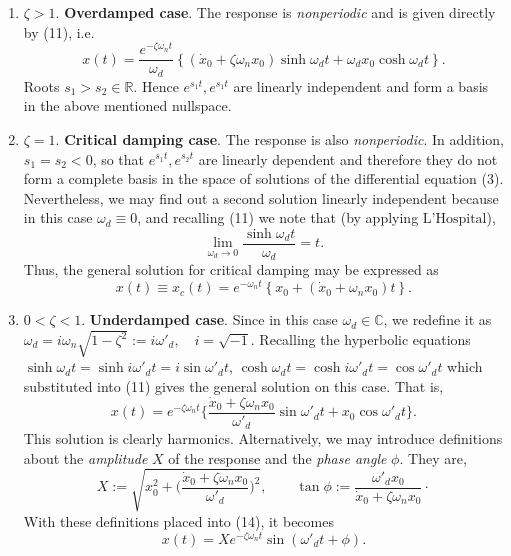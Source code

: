 \documentclass[12pt]{article}
\begin{document}
\begin{enumerate}
\item $\zeta>1$. \textbf{Overdamped case}. The response is \emph{nonperiodic} and is given directly by (11), i.e.
\begin{equation}
x(t)=\frac{e^{-\zeta\omega_n t}}{\omega_d}\left\{(\dot{x}_0+\zeta\omega_n x_0)\sinh{\omega_d t}+
\omega_d x_0\cosh{\omega_d t}\right\}.
\end{equation}
Roots $s_1>s_2\in\mathbb{R}$. Hence $e^{s_1 t},e^{s_1 t}$ are linearly independent and form a basis in the above mentioned nullspace.
\item $\zeta=1$. \textbf{Critical damping case}. The response is also \emph{nonperiodic}. In addition, $s_1=s_2<0$, so that $e^{s_1 t}, e^{s_2 t}$ are linearly dependent and therefore they do not form a complete basis in the space of solutions of the differential equation (3). Nevertheless, we may find out a second solution linearly independent because in this case $\omega_d\equiv 0$, and recalling (11) we note that (by applying $\textrm{L'Hospital}$),
\begin{equation*}
\lim_{\omega_d\to 0}\frac{\sinh{\omega_d t}}{\omega_d}=t. 
\end{equation*}
Thus, the general solution for critical damping may be expressed as
\begin{equation}
x(t)\equiv x_c(t)=e^{-\omega_n t}\left\{x_0+(\dot{x}_0+\omega_n x_0)t\right\}.
\end{equation}
\item $0<\zeta<1$. \textbf{Underdamped case}. Since in this case $\omega_d\in\mathbb{C}$, we redefine it as 
$\omega_d=i\omega_n\sqrt{1-\zeta^2}:=i\omega'_d,\quad i=\sqrt{-1}$.
Recalling the hyperbolic equations $\sinh\omega_d t=\sinh i\omega'_d t=i\sin\omega'_d t$, $\cosh\omega_d t=\cosh i\omega'_d t=\cos\omega'_d t$ which substituted into (11) gives the general solution on this case. That is,
\begin{equation}
x(t)=e^{-\zeta\omega_n t}\bigg\{\frac{\dot{x}_0+\zeta\omega_n x_0}{\omega'_d}\sin{\omega'_d t}+
x_0\cos{\omega'_d t}\bigg\}.
\end{equation}
This solution is clearly harmonics. Alternatively, we may introduce definitions about the \emph{amplitude} $X$ of the response and the \emph{phase angle} $\phi$. They are,
\begin{equation}
X:=\sqrt{x_0^2+\bigg(\frac{\dot{x}_0+\zeta\omega_n x_0}{\omega'_d}\bigg)^2},\qquad
\tan\phi:=\frac{\omega'_d x_0}{\dot{x}_0+\zeta\omega_n x_0}\cdot
\end{equation}
With these definitions placed into (14), it becomes
\begin{equation}
x(t)=Xe^{-\zeta\omega_n t}\sin{(\omega'_d t+\phi)}.
\end{equation}
\end{enumerate}
\end{document}
